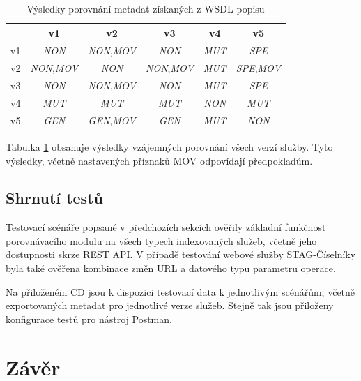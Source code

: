 \documentclass[czech,DP]{thesiskiv}
\begin{document}
\begin{table}[h]
	\centering
	\begin{tabular}{|l||c|c|c|c|c|}
		\hline
		& v1 & v2 & v3 & v4 & v5 \\
		\hline
		\hline
		v1 & \textit{NON} & \textit{NON},\textit{MOV} & \textit{NON} & \textit{MUT} & \textit{SPE} \\
		\hline
		v2 & \textit{NON},\textit{MOV} & \textit{NON} & \textit{NON},\textit{MOV} & \textit{MUT} & \textit{SPE},\textit{MOV} \\
		\hline
		v3 & \textit{NON} & \textit{NON},\textit{MOV} & \textit{NON} & \textit{MUT} & \textit{SPE} \\
		\hline
		v4 & \textit{MUT} & \textit{MUT} & \textit{MUT} & \textit{NON} & \textit{MUT} \\
		\hline
		v5 & \textit{GEN} & \textit{GEN},\textit{MOV} & \textit{GEN} & \textit{MUT} & \textit{NON} \\
		\hline
	\end{tabular}
	\caption{Výsledky porovnání metadat získaných z WSDL popisu}
	\label{tab:stag-wsdl-cmp-res}
\end{table}

Tabulka \ref{tab:stag-wsdl-cmp-res} obsahuje výsledky vzájemných porovnání všech verzí služby. Tyto výsledky, včetně nastavených příznaků MOV odpovídají předpokladům.

\section{Shrnutí testů}

Testovací scénáře popsané v předchozích sekcích ověřily základní funkčnost porovnávacího modulu na všech typech indexovaných služeb, včetně jeho dostupnosti skrze REST API. V případě testování webové služby STAG-Číselníky byla také ověřena kombinace změn URL a datového typu parametru operace. 

Na přiloženém CD jsou k dispozici testovací data k jednotlivým scénářům, včetně exportovaných metadat pro jednotlivé verze služeb. Stejně tak jsou přiloženy konfigurace testů pro nástroj Postman.


\chapter{Závěr}	

 
% 
%

{\raggedright\small

}
\end{document}
